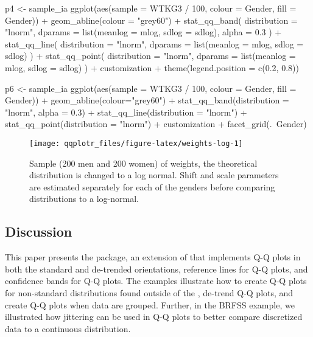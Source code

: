 \begin{Schunk}
\begin{Sinput}
p4 <- sample_ia %>% 
  ggplot(aes(sample = WTKG3 / 100, colour = Gender, fill = Gender)) +
  geom_abline(colour = "grey60") +
  stat_qq_band(
    distribution = "lnorm",
    dparams = list(meanlog = mlog, sdlog = sdlog),
    alpha = 0.3
  ) +
  stat_qq_line(
    distribution = "lnorm",
    dparams = list(meanlog = mlog, sdlog = sdlog)
  ) +
  stat_qq_point(
    distribution = "lnorm",
    dparams = list(meanlog = mlog, sdlog = sdlog)
  ) +
  customization +
  theme(legend.position = c(0.2, 0.8)) 

p6 <- sample_ia %>% 
  ggplot(aes(sample = WTKG3 / 100, colour = Gender, fill = Gender)) +
  geom_abline(colour="grey60") +
  stat_qq_band(distribution = "lnorm", alpha = 0.3) +
  stat_qq_line(distribution = "lnorm") +
  stat_qq_point(distribution = "lnorm") +
  customization + facet_grid(.~Gender)
\end{Sinput}
\begin{figure}

{\centering \texttt{[image: qqplotr\_files/figure-latex/weights-log-1]} 

}

\caption[Sample (200 men and 200 women) of weights, the theoretical distribution  is changed to a log normal]{Sample (200 men and 200 women) of weights, the theoretical distribution  is changed to a log normal. Shift and scale parameters are estimated separately for each of the genders before comparing distributions to a log-normal.}\label{fig:weights-log}
\end{figure}
\end{Schunk}

\subsection{Discussion}\label{discussion}

This paper presents the  package, an extension of
 that implements Q-Q plots in both the standard and
de-trended orientations, reference lines for Q-Q plots, and confidence
bands for Q-Q plots. The examples illustrate how to create Q-Q plots for
non-standard distributions found outside of the , de-trend
Q-Q plots, and create Q-Q plots when data are grouped. Further, in the
BRFSS example, we illustrated how jittering can be used in Q-Q plots to
better compare discretized data to a continuous distribution.

